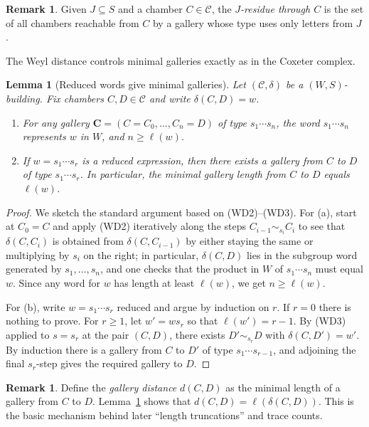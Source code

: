 \documentclass[11pt]{amsart}
\newtheorem{lemma}[thm]{Lemma}
\theoremstyle{definition}
\newtheorem{remark}[thm]{Remark}
\theoremstyle{remark}
\numberwithin{equation}{section}
\begin{document}
\begin{remark}\label{rem:residues}
Given $J\subseteq S$ and a chamber $C\in\mathcal{C}$, the \emph{$J$-residue through $C$} is the set of all chambers
reachable from $C$ by a gallery whose type uses only letters from $J$.
\end{remark}

The Weyl distance controls minimal galleries exactly as in the Coxeter complex.

\begin{lemma}[Reduced words give minimal galleries]\label{lem:reduced-word-minimal-gallery}
Let $(\mathcal{C},\delta)$ be a $(W,S)$-building. Fix chambers $C,D\in\mathcal{C}$ and write $\delta(C,D)=w$.
\begin{enumerate}[label=(\alph*), leftmargin=8mm]
\item For any gallery $\mathbf{C}=(C=C_0,\ldots,C_n=D)$ of type $s_1\cdots s_n$,
the word $s_1\cdots s_n$ represents $w$ in $W$, and $n\ge \ell(w)$.
\item If $w=s_1\cdots s_r$ is a reduced expression, then there exists a gallery from $C$ to $D$
of type $s_1\cdots s_r$. In particular, the minimal gallery length from $C$ to $D$ equals $\ell(w)$.
\end{enumerate}
\end{lemma}

\begin{proof}
We sketch the standard argument based on (WD2)--(WD3).
For (a), start at $C_0=C$ and apply (WD2) iteratively along the steps
$C_{i-1}\sim_{s_i}C_i$ to see that $\delta(C,C_i)$ is obtained from $\delta(C,C_{i-1})$ by either staying
the same or multiplying by $s_i$ on the right; in particular, $\delta(C,D)$ lies in the subgroup word
generated by $s_1,\ldots,s_n$, and one checks that the product in $W$ of $s_1\cdots s_n$ must equal $w$.
Since any word for $w$ has length at least $\ell(w)$, we get $n\ge \ell(w)$.

For (b), write $w=s_1\cdots s_r$ reduced and argue by induction on $r$.
If $r=0$ there is nothing to prove. For $r\ge 1$, let $w'=ws_r$ so that $\ell(w')=r-1$.
By (WD3) applied to $s=s_r$ at the pair $(C,D)$, there exists $D'\sim_{s_r}D$ with $\delta(C,D')=w'$.
By induction there is a gallery from $C$ to $D'$ of type $s_1\cdots s_{r-1}$, and adjoining the final
$s_r$-step gives the required gallery to $D$.
\end{proof}

\begin{remark}\label{rem:distance-function}
Define the \emph{gallery distance} $d(C,D)$ as the minimal length of a gallery from $C$ to $D$.
Lemma~\ref{lem:reduced-word-minimal-gallery} shows that $d(C,D)=\ell(\delta(C,D))$.
This is the basic mechanism behind later ``length truncations'' and trace counts.
\end{remark}
\end{document}
